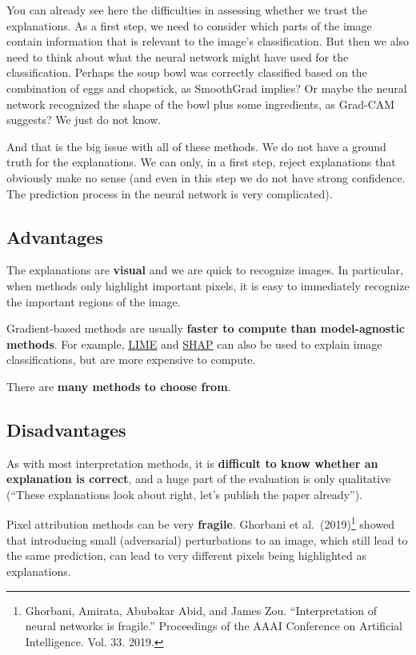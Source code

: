 \documentclass[
  10pt,
]{scrbook}
\begin{document}
You can already see here the difficulties in assessing whether we trust the explanations.
As a first step, we need to consider which parts of the image contain information that is relevant to the image's classification.
But then we also need to think about what the neural network might have used for the classification.
Perhaps the soup bowl was correctly classified based on the combination of eggs and chopstick, as SmoothGrad implies?
Or maybe the neural network recognized the shape of the bowl plus some ingredients, as Grad-CAM suggests?
We just do not know.

And that is the big issue with all of these methods.
We do not have a ground truth for the explanations.
We can only, in a first step, reject explanations that obviously make no sense (and even in this step we do not have strong confidence. The prediction process in the neural network is very complicated).

\hypertarget{advantages-19}{%
\subsection{Advantages}\label{advantages-19}}

The explanations are \textbf{visual} and we are quick to recognize images.
In particular, when methods only highlight important pixels, it is easy to immediately recognize the important regions of the image.

Gradient-based methods are usually \textbf{faster to compute than model-agnostic methods}.
For example, \protect\hyperlink{lime}{LIME} and \protect\hyperlink{shap}{SHAP} can also be used to explain image classifications, but are more expensive to compute.

There are \textbf{many methods to choose from}.

\hypertarget{disadvantages-19}{%
\subsection{Disadvantages}\label{disadvantages-19}}

As with most interpretation methods, it is \textbf{difficult to know whether an explanation is correct}, and a huge part of the evaluation is only qualitative (``These explanations look about right, let's publish the paper already'').

Pixel attribution methods can be very \textbf{fragile}.
Ghorbani et al.~(2019)\footnote{Ghorbani, Amirata, Abubakar Abid, and James Zou. ``Interpretation of neural networks is fragile.'' Proceedings of the AAAI Conference on Artificial Intelligence. Vol. 33. 2019.} showed that introducing small (adversarial) perturbations to an image, which still lead to the same prediction, can lead to very different pixels being highlighted as explanations.
\end{document}
